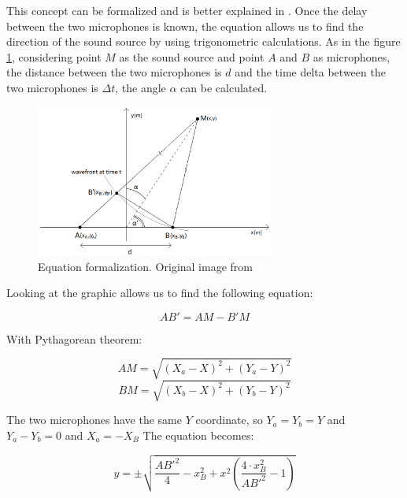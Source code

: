 This concept can be formalized and is better explained in \cite{Scola2010DirectionOA}. Once the delay between the two microphones is known, the equation allows us to find the direction of the sound source by using trigonometric calculations. As in the figure \ref*{fig:sound-source-from-two-microphones}, considering point $M$ as the sound source and point $A$ and $B$ as microphones, the distance between the two microphones is $d$ and the time delta between the two microphones is $\Delta t$, the angle $\alpha$ can be calculated.

\begin{figure}[H]
    \centering
    \includegraphics[width=0.7\textwidth]{../Images/sound-source-from-two-microphones.png}
    \caption{Equation formalization. Original image from \cite{Scola2010DirectionOA}}
    \label{fig:sound-source-from-two-microphones}
\end{figure}

Looking at the graphic allows us to find the following equation:

\begin{equation}
    AB' = AM-B'M
\end{equation}

With Pythagorean theorem: 

\begin{equation}
    AM = \sqrt{(X_{a}-X)^2 + (Y_{a}-Y)^2}
\end{equation}
\begin{equation}
    BM = \sqrt{(X_{b}-X)^2 + (Y_{b}-Y)^2}
\end{equation}

The two microphones have the same $Y$ coordinate, so $Y_{a} = Y_{b} = Y$ and $Y_{a}-Y_{b} = 0$ and $X_{a} = -X_{B}$ The equation becomes:

\begin{equation}
    y = \pm\sqrt{\frac{AB'^2}{4} - x^2_{B} + x^2(\frac{4\cdot x^2_{B}}{AB'^2} - 1)}
\end{equation}


